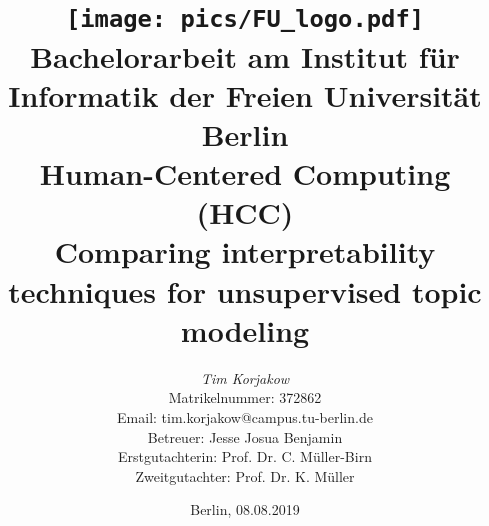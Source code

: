 %
\begin{titlepage}

\title{\texttt{[image: pics/FU\_logo.pdf]}\\
{\small Bachelorarbeit am Institut für Informatik der Freien Universität Berlin}\\
{\small Human-Centered Computing (HCC)}\\
[6ex]
{\LARGE Comparing interpretability techniques for unsupervised topic modeling}}

\author{
{\emph{\normalsize Tim Korjakow}}\\
{\normalsize Matrikelnummer: 372862}\\
{\normalsize Email: tim.korjakow@campus.tu-berlin.de}\\ 
[18ex]   
{\normalsize Betreuer: Jesse Josua Benjamin} \\
{\normalsize Erstgutachterin: Prof. Dr. C. Müller-Birn} \\
{\normalsize Zweitgutachter: Prof. Dr. K. Müller}}
\vspace{6ex}
\date{\normalsize Berlin, 08.08.2019}
 
\maketitle  

\end{titlepage}